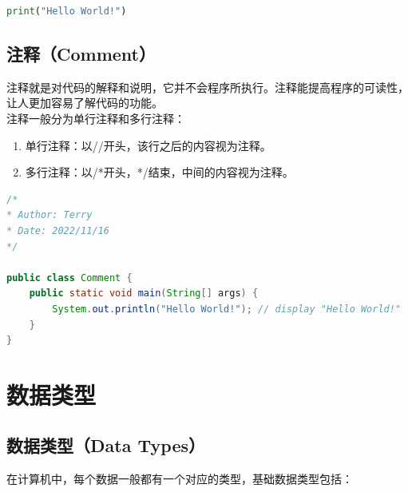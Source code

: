 
\begin{lstlisting}[language=Python]
print("Hello World!")
\end{lstlisting}

\vspace{0.5cm}

\subsection{注释（Comment）}

注释就是对代码的解释和说明，它并不会程序所执行。注释能提高程序的可读性，让人更加容易了解代码的功能。\\

注释一般分为单行注释和多行注释：

\begin{enumerate}
	\item 单行注释：以//开头，该行之后的内容视为注释。
	\item 多行注释：以/*开头，*/结束，中间的内容视为注释。
\end{enumerate}

\vspace{0.5cm}


\begin{lstlisting}[language=Java]
/*
* Author: Terry
* Date: 2022/11/16
*/

public class Comment {
	public static void main(String[] args) {
		System.out.println("Hello World!"); // display "Hello World!"
	}
}
\end{lstlisting}

\newpage

\section{数据类型}

\subsection{数据类型（Data Types）}

在计算机中，每个数据一般都有一个对应的类型，基础数据类型包括：

